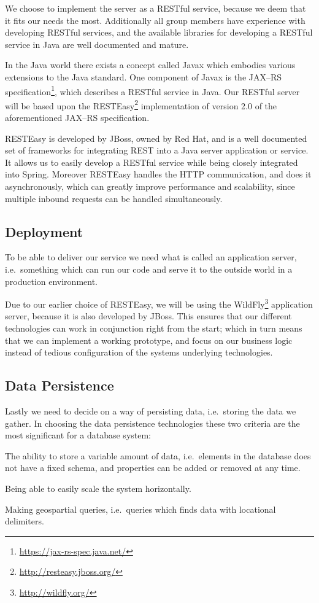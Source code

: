 We choose to implement the server as a RESTful service, because we deem that it fits our needs the most.
Additionally all group members have experience with developing RESTful services, and the available libraries for developing a RESTful service in Java are well documented and mature.

\bigskip
In the Java world there exists a concept called Javax which embodies various extensions to the Java standard.
One component of Javax is the JAX--RS specification\footnote{\url{https://jax-rs-spec.java.net/}}, which describes a RESTful service in Java.
Our RESTful server will be based upon the RESTEasy\footnote{\url{http://resteasy.jboss.org/}} implementation of version 2.0 of the aforementioned JAX--RS specification.

RESTEasy is developed by JBoss, owned by Red Hat, and is a well documented set of frameworks for integrating REST into a Java server application or service.
It allows us to easily develop a RESTful service while being closely integrated into Spring.
Moreover RESTEasy handles the HTTP communication, and does it asynchronously, which can greatly improve performance and scalability,
since multiple inbound requests can be handled simultaneously.

\subsection{Deployment}
To be able to deliver our service we need what is called an application server, i.e.~something which can run our code and serve it to the outside world in a production environment.

Due to our earlier choice of RESTEasy, we will be using the WildFly\footnote{\url{http://wildfly.org/}} application server, because it is also developed by JBoss.
This ensures that our different technologies can work in conjunction right from the start;
which in turn means that we can implement a working prototype, and focus on our business logic instead of tedious configuration of the systems underlying technologies.

\subsection{Data Persistence}
Lastly we need to decide on a way of persisting data, i.e.~storing the data we gather.
In choosing the data persistence technologies these two criteria are the most significant for a database system:
\begin{eletterate}
    \item The ability to store a variable amount of data, i.e.~elements in the database does not have a fixed schema, and properties can be added or removed at any time.
    \item Being able to easily scale the system horizontally.
    \item Making geospartial queries, i.e.~queries which finds data with locational delimiters.
\end{eletterate}

